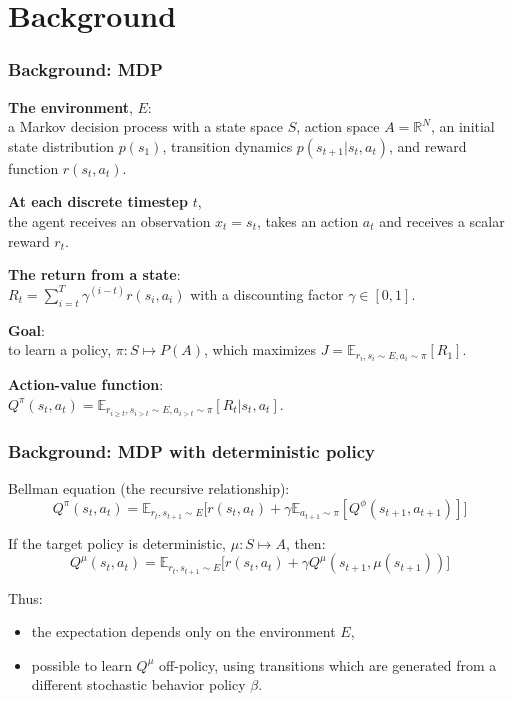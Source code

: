 \section{Background}

\begin{frame}
\frametitle{Background: MDP}
\textbf{The environment}, $E$: \\
a Markov decision process with a state space $S$, action space $A = \mathbb{R}^N$,
an initial state distribution $p(s_1)$, transition dynamics $p(s_{t+1}|s_t, a_t)$, and
reward function $r(s_t, a_t)$.
\vspace{2.5mm}

\textbf{At each discrete timestep} $t$, \\
the agent receives an observation $x_t = s_t$,
takes an action $a_t$ and receives a scalar reward $r_t$.
\vspace{2.5mm}

\textbf{The return from a state}: \\
$R_t= \sum_{i=t}^T  \gamma^{(i-t)} r(s_i, a_i)$ with a discounting factor $\gamma \in [0, 1]$.
\vspace{2.5mm}

\textbf{Goal}: \\
to learn a policy, $\pi: S \mapsto P(A)$, which
maximizes $J = \mathbb{E}_{r_i,s_i \sim E,a_i \sim \pi} [R_1]$.
\vspace{2.5mm}

\textbf{Action-value function}:\\
$Q^{\pi}(s_t,a_t) = \mathbb{E}_{r_{i \ge t},s_{i>t} \sim E,a_{i>t} \sim \pi} [R_t|s_t,a_t]$.
\end{frame}

\begin{frame}
\frametitle{Background: MDP with deterministic policy}
Bellman equation (the recursive relationship):
\begin{equation}
Q^{\pi} (s_t,a_t) = \mathbb{E}_{r_{t},s_{t+1} \sim E} \Big[ r(s_t,a_t) + \gamma \mathbb{E}_{a_{t+1} \sim \pi} [Q^{\phi}(s_{t+1},a_{t+1})] \Big]
\end{equation}

If the target policy is deterministic, $\mu: S \mapsto A$, then:
\begin{equation}
Q^{\mu} (s_t,a_t) = \mathbb{E}_{r_{t},s_{t+1} \sim E} \Big[ r(s_t,a_t) + \gamma Q^{\mu}(s_{t+1},\mu(s_{t+1})) \Big]
\end{equation}

Thus:
\begin{itemize}
\item the expectation depends only on the environment $E$,
\item possible to learn $Q^{\mu}$ off-policy, using transitions which
are generated from a different stochastic behavior policy $\beta$.
\end{itemize}
\end{frame}

